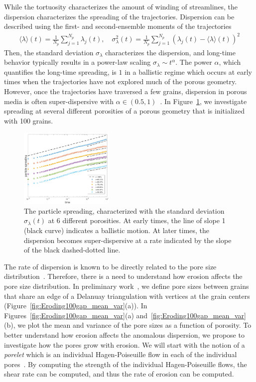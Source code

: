 \documentclass[11pt]{article}
\begin{document}
While the tortuosity characterizes the amount of winding of streamlines, the dispersion characterizes the spreading of the trajectories.  Dispersion can be described using the first- and second-ensemble moments of the trajectories
\begin{align}
  \langle \lambda \rangle (t) = \frac{1}{N_p} \sum_{j=1}^{N_p}
    \lambda_j(t), \quad \sigma_\lambda^{2}(t) = \frac{1}{N_p}
    \sum_{j=1}^{N_p} (\lambda_j(t) - \langle \lambda \rangle(t))^2
\end{align}
Then, the standard deviation $\sigma_\lambda$ characterizes the dispersion, and long-time behavior typically results in a power-law scaling $\sigma_\lambda \sim t^{\alpha}$. The power $\alpha$, which quantifies the long-time spreading, is $1$ in a ballistic regime which occurs at early times when the trajectories have not explored much of the porous geometry. However, once the trajectories have traversed a few grains, dispersion in porous media is often super-dispersive with $\alpha \in (0.5,1)$~\cite{dea-leb-den-tar-bol-dav2013}. In Figure~\ref{fig:100dispersion}, we investigate spreading at several different porosities of a porous geometry that is initialized with 100 grains.
\begin{figure}
  \includegraphics[width=0.4\textwidth]{figs/100b_second_moment_long_ref}
  \caption{\label{fig:100dispersion} The particle spreading,
  characterized with the standard deviation $\sigma_\lambda(t)$ at 6
  different porosities. At early times, the line of slope 1 (black
  curve) indicates a ballistic motion. At later times, the
  dispersion becomes super-dispersive at a rate indicated by the slope
  of the black dashed-dotted line.}
\end{figure}

The rate of dispersion is known to be directly related to the pore size
distribution~\cite{dea-qua-bir-jua2018}. Therefore, there is a need to
understand how erosion affects the pore size distribution. In
preliminary work~\cite{chi-moo-qua2019}, we define pore sizes between grains that share an edge of a Delanuay triangulation with vertices at the grain centers (Figure~\ref{fig:Eroding100gap_mean_var}(a)). In Figures~\ref{fig:Eroding100gap_mean_var}(a) and~\ref{fig:Eroding100gap_mean_var}(b), we plot the mean and variance of the pore sizes as a function of porosity. To better understand how erosion affects the anomalous dispersion, we propose to investigate how the pores grow with erosion. We will start with the notion of a {\em porelet} which is an individual Hagen-Poiseuille flow in each of the individual pores~\cite{dea-qua-bir-jua2018}. By computing the strength of the individual Hagen-Poiseuille flows, the shear rate can be computed, and thus the rate of erosion can be computed. 
\end{document}
